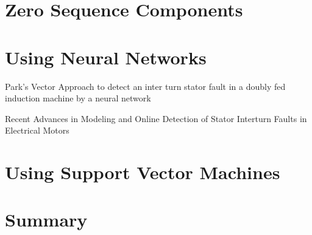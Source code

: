 \section{Zero Sequence Components} %
\label{sec:zero_sequence_components}

\section{Using Neural Networks} %
\label{sec:using_nn}

Park’s Vector Approach to detect an inter turn stator fault in a doubly fed induction machine by a neural network 

Recent Advances in Modeling and Online Detection of Stator Interturn Faults in Electrical Motors

\section{Using Support Vector Machines} %
\label{sec:using_svm}

\section{Summary} %
\label{sec:related_work_summary}
